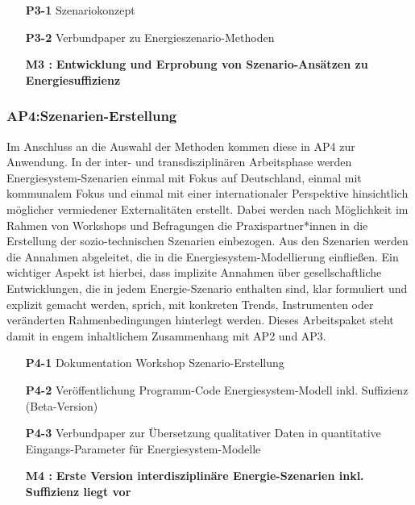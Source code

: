 \documentclass[a4paper,11pt,twoside]{scrartcl}
\begin{document}
\begin{itemize}
    \item[\textbf{P3-1}] Szenariokonzept 
    \item[\textbf{P3-2}] Verbundpaper zu Energieszenario-Methoden 
    \item[\textbf{M3 :}] \textbf{Entwicklung und Erprobung von Szenario-Ansätzen zu Energiesuffizienz}
\end{itemize}

\subsubsection*{AP4:Szenarien-Erstellung}
Im Anschluss an die Auswahl der Methoden kommen diese in AP4 zur Anwendung. In der inter- und transdisziplinären Arbeitsphase werden Energiesystem-Szenarien einmal mit Fokus auf Deutschland, einmal mit kommunalem Fokus und einmal mit einer internationaler Perspektive hinsichtlich möglicher vermiedener Externalitäten erstellt. Dabei werden nach Möglichkeit im Rahmen von Workshops und Befragungen die Praxispartner*innen in die Erstellung der sozio-technischen Szenarien einbezogen. Aus den Szenarien werden die Annahmen abgeleitet, die in die Energiesystem-Modellierung einfließen. Ein wichtiger Aspekt ist hierbei, dass implizite Annahmen über gesellschaftliche Entwicklungen, die in jedem Energie-Szenario enthalten sind, klar formuliert und explizit gemacht werden, sprich, mit konkreten Trends, Instrumenten oder veränderten Rahmenbedingungen hinterlegt werden. Dieses Arbeitspaket steht damit in engem inhaltlichem Zusammenhang mit AP2 und AP3.
\begin{itemize}
    \item[\textbf{P4-1}] Dokumentation Workshop Szenario-Erstellung
    \item[\textbf{P4-2}] Veröffentlichung Programm-Code Energiesystem-Modell inkl. Suffizienz (Beta-Version)
    \item[\textbf{P4-3}] Verbundpaper zur Übersetzung qualitativer Daten in quantitative Eingangs-Parameter für Energiesystem-Modelle
    \item[\textbf{M4 :}] \textbf{Erste Version interdisziplinäre Energie-Szenarien inkl. Suffizienz liegt vor}
\end{itemize}
\end{document}
